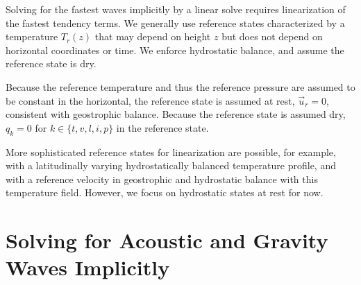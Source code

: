 \documentclass{report}
\begin{document}
Solving for the fastest waves implicitly by a linear solve requires linearization of the fastest tendency terms. We generally use reference states characterized by a temperature $T_r(z)$ that may depend on height $z$ but does not depend on horizontal coordinates or time. We enforce hydrostatic balance, and assume the reference state is dry.

Because the reference temperature and thus the reference pressure are assumed to be constant in the horizontal, the reference state is assumed at rest, $\vec{u}_r = 0$, consistent with geostrophic balance. Because the reference state is assumed dry, $q_k= 0$ for $k \in \{ t, v, l, i, p\}$ in the reference state.

More sophisticated reference states for linearization are possible, for example, with a latitudinally varying hydrostatically balanced temperature profile, and with a reference velocity in geostrophic and hydrostatic balance with this temperature field. However, we focus on hydrostatic states at rest for now. 
 
 \section{Solving for Acoustic and Gravity Waves Implicitly}
 \label{s:IMEX_general}
\end{document}
